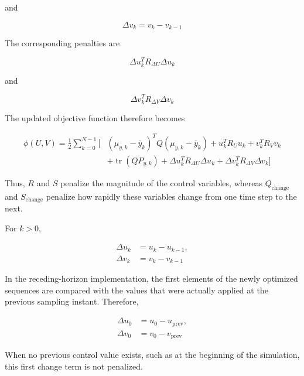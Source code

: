 and

\begin{equation}
    \Delta v_k
    =
    v_k-v_{k-1}
\end{equation}

The corresponding penalties are

\begin{equation}
    \Delta u_k^T R_{\Delta U}\Delta u_k
\end{equation}

and

\begin{equation}
    \Delta v_k^T R_{\Delta V}\Delta v_k
\end{equation}

The updated objective function therefore becomes

\begin{align}
    \phi(U,V)
    =
    \frac{1}{2}
    \sum_{k=0}^{N-1}
    \Big[
    &
    (\mu_{y,k}-\bar{y}_k)^T
    Q
    (\mu_{y,k}-\bar{y}_k)
    +
    u_k^T R_U u_k
    +
    v_k^T R_V v_k
    \nonumber\\
    &
    +
    \operatorname{tr}(Q P_{y,k})
    +
    \Delta u_k^T
    R_{\Delta U}
    \Delta u_k
    +
    \Delta v_k^T
    R_{\Delta V}
    \Delta v_k
    \Big]
    \label{eq:district_updated_cost}
\end{align}

Thus, \(R\) and \(S\) penalize the magnitude of the control variables,
whereas \(Q_{\mathrm{change}}\) and \(S_{\mathrm{change}}\) penalize how
rapidly these variables change from one time step to the next.

For \(k>0\),

\begin{align}
    \Delta u_k &= u_k-u_{k-1},\\
    \Delta v_k &= v_k-v_{k-1}
\end{align}

In the receding-horizon implementation, the first elements of the newly
optimized sequences are compared with the values that were actually applied
at the previous sampling instant. Therefore,

\begin{align}
    \Delta u_0
    &=
    u_0-u_{\mathrm{prev}},\\
    \Delta v_0
    &=
    v_0-v_{\mathrm{prev}}
\end{align}

When no previous control value exists, such as at the beginning of the
simulation, this first change term is not penalized.

